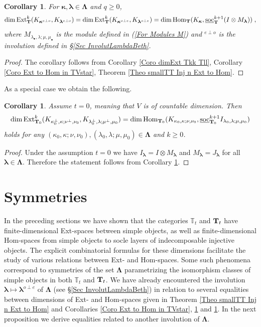 \documentclass[12pt]{article}
\def\TT {{\mathbb T}}     %
\def\ul  {\underline}
\newtheorem{coro}[theorem]{Corollary}
\begin{document}
\begin{coro}\label{Coro Ext to Hom in IT}
For $\bm\kappa,\bm\lambda\in\bm\Lambda$ and $q\geq0$,
$$
\dim {\rm Ext}_{{\bf T}}^k (K_{\bm\kappa^{e\perp o}},K_{\bm\lambda^{e\perp o}})= \dim {\rm Ext}_{{\bf T}}^k (K_{\bm\kappa^{o\perp e}},K_{\bm\lambda^{o\perp e}}) = \dim {\rm Hom}_{\bf T}(K_{\bm\kappa},\ul{\rm soc}_{\bf T}^{k+1}(I\otimes M_{\bm\lambda}))\;,
$$
where $M_{\lambda_\bullet,\lambda;\mu,\mu_\bullet}$ is the module defined in (\ref{For Modules M}) and ${^{e\perp o}}$ is the involution defined in \S\ref{Sec InvolutLambdaBeth}.
\end{coro}


\begin{proof}
The corollary follows from Corollary \ref{Coro dimExt Tkk Tll}, Corollary \ref{Coro Ext to Hom in TVstar}, Theorem \ref{Theo smallTT Inj n Ext to Hom}.
\end{proof}

As a special case we obtain the following.

\begin{coro}\label{Coro Ext to Hom IT aleph0}
Assume $t=0$, meaning that $V$ is of countable dimension. Then
$$
\dim {\rm Ext}_{{\bf T}_0}^k (K_{\kappa_0^\perp,\kappa;\nu^\perp,\nu_0},K_{\lambda_0^\perp,\lambda;\mu^\perp,\mu_0}) = \dim {\rm Hom}_{{\bf T}_0}(K_{\kappa_0,\kappa;\nu,\nu_0},\ul{\rm soc}_{{\bf T}_0}^{k+1}I_{\lambda_0,\lambda;\mu,\mu_0})
$$
holds for any $(\kappa_0,\kappa;\nu,\nu_0), (\lambda_0,\lambda;\mu,\mu_0)\in\bm\Lambda$ and $k\geq0$.
\end{coro}

\begin{proof}
Under the assumption $t=0$ we have $I_{\bm\lambda}=I\otimes M_{\bm\lambda}$ and $M_{\bm\lambda}=J_{\bm\lambda}$ for all $\bm\lambda\in\bm\Lambda$. Therefore the statement follows from Corollary \ref{Coro Ext to Hom in IT}.
\end{proof}



\section{Symmetries}\label{Sec Sym}

In the preceding sections we have shown that the categories $\TT_t$ and ${\bf T}_t$ have finite-dimensional Ext-spaces between simple objects, as well as finite-dimensional Hom-spaces from simple objects to socle layers of indecomposable injective objects. The explicit combinatorial formulas for these dimensions facilitate the study of various relations between Ext- and Hom-spaces. Some such phenomena correspond to symmetries of the set $\bm\Lambda$ parametrizing the isomorphism classes of simple objects in both $\TT_t$ and ${\bf T}_t$. We have already encountered the involution $\bm\lambda\mapsto\bm\lambda^{o\perp e}$ of $\bm\Lambda$ (see \S\ref{Sec InvolutLambdaBeth}) in relation to several equalities between dimensions of Ext- and Hom-spaces given in Theorem \ref{Theo smallTT Inj n Ext to Hom} and Corollaries \ref{Coro Ext to Hom in TVstar}, \ref{Coro Ext to Hom in IT} and \ref{Coro Ext to Hom IT aleph0}. In the next proposition we derive equalities related to another involution of $\bm\Lambda$. 
\end{document}
